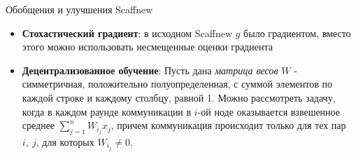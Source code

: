 \documentclass[russian,xcolor=dvipsnames]{beamer}
\begin{document}
\begin{frame}{Обобщения и улучшения Scaffnew}
\begin{itemize}
    \item \textbf{Стохастический градиент}: в исходном Scaffnew $g$ было градиентом, вместо этого можно использовать несмещенные оценки градиента
    \item \textbf{Децентрализованное обучение}: Пусть дана \textit{матрица весов} $W$ - симметричная, положительно полуопределенная, с суммой элементов по каждой строке и каждому столбцу, равной 1. Можно рассмотреть задачу, когда в каждом раунде коммуникации в $i$-ой ноде оказывается взвешенное среднее $\sum\limits_{j=1}^n W_{i_j} x_j$, причем коммуникация происходит только для тех пар $i,\ j$, для которых $W_{i_j} \ne 0$. 
\end{itemize}
\end{frame}
\end{document}
